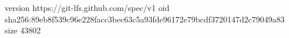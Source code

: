 version https://git-lfs.github.com/spec/v1
oid sha256:89eb8f539c96e228facc3bec63c5a93fde96172e79bcdf3720147d2c79049a83
size 43802
